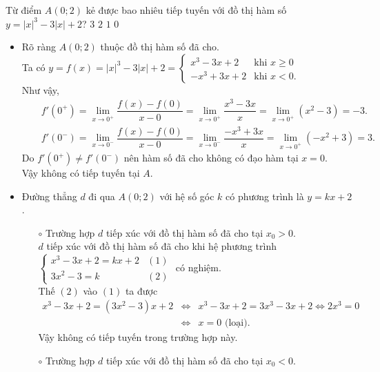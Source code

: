 \begin{ex}%
 Từ điểm $A(0;2)$ kẻ được bao nhiêu tiếp tuyến với đồ thị hàm số $y=|x|^3-3|x|+2$?
 \choice
  {$3$}
  {$2$}
  {$1$}
  {\True $0$}
 \loigiai
  {
  \begin{itemize}
   \item Rõ ràng $A(0;2)$ thuộc đồ thị hàm số đã cho.\\
   Ta có $y=f(x)=|x|^3-3|x|+2 = \begin{cases} x^3-3x+2 & \text{khi } x \geq 0 \\ -x^3+3x+2 & \text{khi } x<0. \end{cases}$\\
   Như vậy,
   \allowdisplaybreaks
   \begin{eqnarray*}
    && f'(0^+) = \lim\limits_{x \to 0^+} \dfrac{f(x)-f(0)}{x-0} = \lim\limits_{x \to 0^+} \dfrac{x^3-3x}{x} = \lim\limits_{x \to 0^+} (x^2-3) = -3.\\
    && f'(0^-) = \lim\limits_{x \to 0^-} \dfrac{f(x)-f(0)}{x-0} = \lim\limits_{x \to 0^-} \dfrac{-x^3+3x}{x} = \lim\limits_{x \to 0^+} (-x^2+3) = 3.
   \end{eqnarray*}
   Do $f'(0^+) \neq f'(0^-)$ nên hàm số đã cho không có đạo hàm tại $x=0$.\\
   Vậy không có tiếp tuyến tại $A$.
   \item Đường thẳng $d$ đi qua $A(0;2)$ với hệ số góc $k$ có phương trình là $y = kx+2$.
   \begin{itemize}
    \item[$\circ$] Trường hợp $d$ tiếp xúc với đồ thị hàm số đã cho tại $x_0 > 0$.\\
    $d$ tiếp xúc với đồ thị hàm số đã cho khi hệ phương trình $\begin{cases} x^3-3x+2 = kx+2 & (1) \\ 3x^2-3 = k & (2)\end{cases}$ có nghiệm.\\
    Thế $(2)$ vào $(1)$ ta được
    \begin{eqnarray*}
     x^3-3x+2=(3x^2-3)x+2 &\Leftrightarrow & x^3-3x+2=3x^3-3x+2 \Leftrightarrow 2x^3=0\\
     &\Leftrightarrow & x = 0 \text{ (loại)}.
    \end{eqnarray*}
    Vậy không có tiếp tuyến trong trường hợp này.
    \item[$\circ$] Trường hợp $d$ tiếp xúc với đồ thị hàm số đã cho tại $x_0 < 0$.\\

\end{itemize}
\end{itemize}}
\end{ex}
